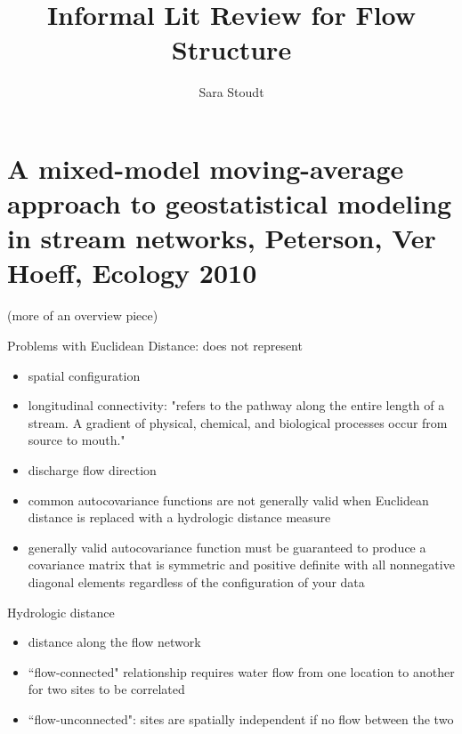 \documentclass[12pt]{amsart}
\title{Informal Lit Review for Flow Structure}
\author{Sara Stoudt}
\begin{document}
\maketitle

\section{A mixed-model moving-average approach to geostatistical modeling
in stream networks, Peterson, Ver Hoeff, Ecology 2010}

(more of an overview piece)

Problems with Euclidean Distance:  does not represent 
\begin{itemize}
\item spatial configuration
\item longitudinal connectivity: "refers to the pathway along the entire length of a stream. A gradient of physical, chemical, and biological processes occur from source to mouth."
\item discharge
\ite flow direction
\item common autocovariance functions are not generally valid when Euclidean distance is replaced with a hydrologic distance measure
\item generally valid autocovariance function must be guaranteed to produce a covariance matrix that is symmetric and positive definite with all nonnegative diagonal elements regardless of the configuration of your data
\end{itemize}

Hydrologic distance
\begin{itemize}
\item distance along the flow network
\item ``flow-connected" relationship requires water flow from one location to another for two sites to be correlated
\item ``flow-unconnected": sites are spatially independent if no flow between the two
\end{itemize}
\end{document}
